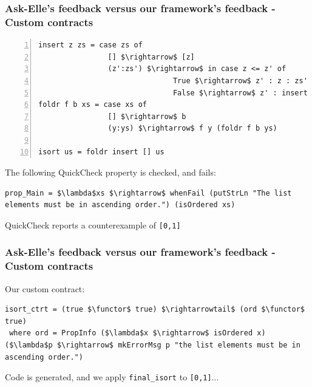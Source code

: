\documentclass[]{beamer}
\makeatletter
\newcommand{\functor}{<\!\!\!@\!\!\!>}
\makeatother
\begin{document}
\begin{frame}[fragile]
\frametitle{Ask-Elle's feedback versus our framework's feedback - Custom contracts}

\begin{lstlisting}[mathescape,numbers=left]
insert z zs = case zs of
                [] $\rightarrow$ [z]
                (z':zs') $\rightarrow$ in case z <= z' of
                               True $\rightarrow$ z' : z : zs'
                               False $\rightarrow$ z' : insert z zs'
foldr f b xs = case xs of
                [] $\rightarrow$ b
                (y:ys) $\rightarrow$ f y (foldr f b ys)
                
isort us = foldr insert [] us
\end{lstlisting}

The following QuickCheck property is checked, and fails:

\begin{lstlisting}[mathescape]
prop_Main = $\lambda$xs $\rightarrow$ whenFail (putStrLn "The list elements must be in ascending order.") (isOrdered xs)
\end{lstlisting}

QuickCheck reports a counterexample of \texttt{[0,1]}

\end{frame}

\begin{frame}[fragile]
\frametitle{Ask-Elle's feedback versus our framework's feedback - Custom contracts}

Our custom contract:

\begin{lstlisting}[mathescape]
isort_ctrt = (true $\functor$ true) $\rightarrowtail$ (ord $\functor$ true)
 where ord = PropInfo ($\lambda$x $\rightarrow$ isOrdered x) ($\lambda$p $\rightarrow$ mkErrorMsg p "the list elements must be in ascending order.") 
\end{lstlisting}

Code is generated, and we apply \texttt{\underline{\hspace{1.5em}}final\_isort} to \texttt{[0,1]}...

\end{frame}
\end{document}
